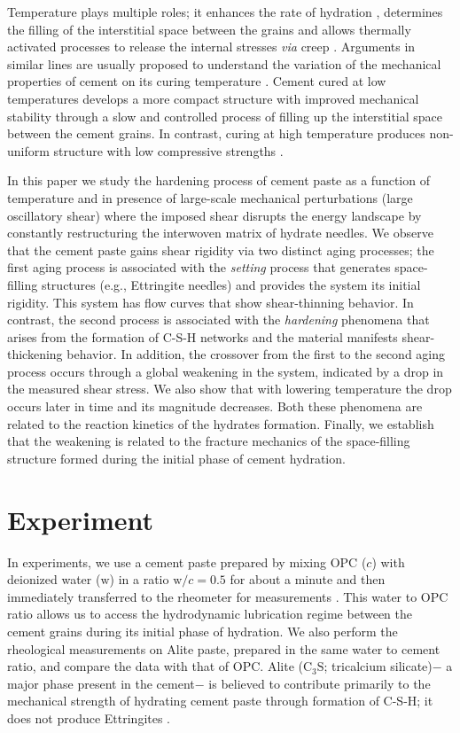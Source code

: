 \documentclass[final,5p,twocolumn]{elsarticle}
\begin{document}
	{Temperature plays multiple roles; it enhances the rate of hydration \cite{gallucci_2013}, determines the filling of the interstitial space between the grains and allows thermally activated processes to release the internal stresses {\it via} creep \cite{Elkhadiri_2009, coussot_avalanche_2002}. Arguments in similar lines are usually proposed to understand the variation of the mechanical properties of cement on its curing temperature \cite{Elkhadiri_2009, elkhadiri_effect_2008}. Cement cured at low temperatures develops a more compact structure with improved mechanical stability  through a slow and controlled process of filling up the interstitial space between the cement grains. In contrast, curing at high temperature produces non-uniform structure with low compressive strengths \cite{elkhadiri_effect_2008, beaudoin_pore_1994}.     



	
	In this paper we study the hardening process of cement paste as a function of temperature and  in presence of large-scale mechanical perturbations (large oscillatory shear) where the imposed shear disrupts the energy landscape by constantly restructuring the interwoven matrix of hydrate needles. We observe that the cement paste gains shear rigidity via two distinct aging processes; the first  aging process is associated with the \textit{setting} process  that generates space-filling structures (e.g.,  Ettringite needles) and  provides the system its initial rigidity.  This system has  flow curves that show shear-thinning behavior. In contrast, the second  process is associated with the \textit{hardening}  phenomena that  arises from the formation of C-S-H networks and the material manifests shear-thickening behavior.  In addition, the crossover from the first to the second aging process occurs through a global weakening in the system,  indicated by a drop in the measured shear stress. We also show that with lowering temperature the drop occurs later in time and its magnitude decreases. Both these phenomena  are related to the reaction kinetics of the hydrates formation. Finally, we establish that the weakening is related to the fracture mechanics of the  space-filling structure formed during the initial phase of cement hydration. 
\section{Experiment}
In experiments, we use a cement paste prepared by mixing OPC ($c$) with deionized water ($\mbox{w}$) in  a ratio $\mbox{w}/c=0.5$ for about a minute and then immediately transferred to the rheometer for measurements \cite{mazumder_temporal_2005}. This  water to OPC ratio  allows us to  access the  hydrodynamic lubrication regime  between the cement grains during its initial phase of hydration. We also perform the rheological measurements on Alite paste, prepared in the same water to cement ratio, and compare the data with that of  OPC.  Alite ($\mbox{C}_3\mbox{S}$; tricalcium silicate)$-$ a major phase present in the cement$-$ is believed to contribute primarily to the mechanical strength of hydrating cement paste through formation of C-S-H; it does not produce Ettringites \cite{h_f_w_taylor_cement_1997,  nachbaur_dynamic_2001, barnes_2002}.
}
\end{document}
